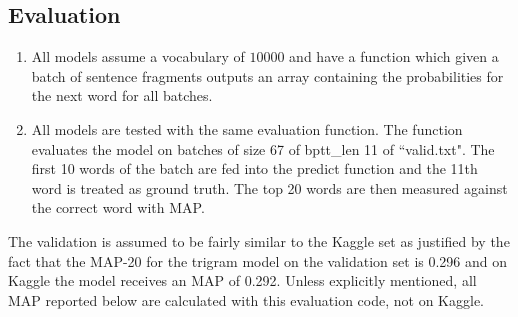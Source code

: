 \documentclass[11pt]{article}
\begin{document}
\subsection{Evaluation}
\begin{enumerate}
\item All models assume a vocabulary of $10000$ and have a  function which given a batch of sentence fragments outputs an array containing the probabilities for the next word for all batches.

\item All models are tested with the same evaluation function. The function evaluates the model on batches of size 67 of bptt\_len 11 of ``valid.txt". The first 10 words of the batch are fed into the predict function and the 11th word is treated as ground truth. The top 20 words are then measured against the correct word with MAP.
\end{enumerate}
The validation is assumed to be fairly similar to the Kaggle set as justified by the fact that the MAP-20 for the trigram model on the validation set is 0.296 and on Kaggle the model receives an MAP of 0.292. Unless explicitly mentioned, all MAP reported below are calculated with this evaluation code, not on Kaggle.
\end{document}
